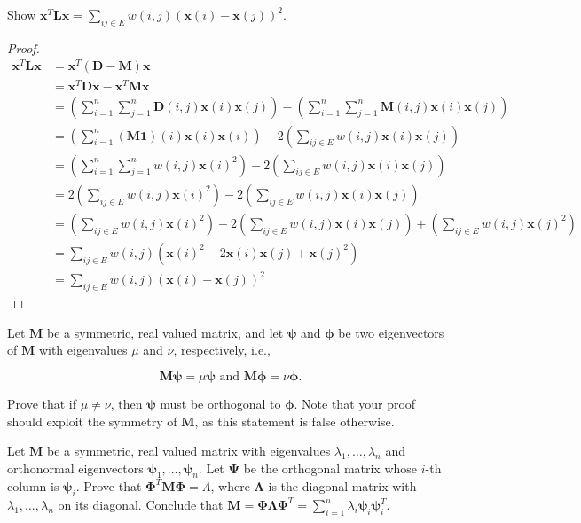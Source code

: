 \documentclass[11pt,letterpaper]{article}
\begin{document}
\begin{exercise} Show $\bm{x}^T\bm{L}\bm{x} = \sum_{ij \in E} w(i,j)(\bm{x}(i) - \bm{x}(j))^2$.
\end{exercise}

\begin{proof}
  \begin{align*}
    \bm{x}^T\bm{L}\bm{x} &= \bm{x}^T(\bm{D} - \bm{M})\bm{x}\\
    &= \bm{x}^T \bm{D}\bm{x} - \bm{x}^T \bm{M}\bm{x}\\
    &= \left(\sum_{i=1}^n \sum_{j=1}^n \bm{D}(i,j) \bm{x}(i) \bm{x}(j)\right)
    - \left(\sum_{i=1}^n \sum_{j=1}^n \bm{M}(i,j) \bm{x}(i) \bm{x}(j)\right)\\
    &= \left(\sum_{i=1}^n (\bm{M}\bm{1})(i) \bm{x}(i) \bm{x}(i)\right)
    - 2 \left(\sum_{ij \in E} w(i,j) \bm{x}(i) \bm{x}(j)\right)\\
    &= \left(\sum_{i=1}^n \sum_{j=1}^n w(i,j) \bm{x}(i)^2\right)
    - 2 \left(\sum_{ij \in E} w(i,j) \bm{x}(i) \bm{x}(j)\right)\\
    &= 2\left(\sum_{ij \in E} w(i,j) \bm{x}(i)^2\right)
    - 2 \left(\sum_{ij \in E} w(i,j) \bm{x}(i) \bm{x}(j)\right)\\
    &= \left(\sum_{ij \in E} w(i,j) \bm{x}(i)^2\right)
    - 2 \left(\sum_{ij \in E} w(i,j) \bm{x}(i) \bm{x}(j)\right)
    + \left(\sum_{ij \in E} w(i,j) \bm{x}(j)^2\right)\\
    &= \sum_{ij \in E} w(i,j) \left(\bm{x}(i)^2 - 2 \bm{x}(i) \bm{x}(j) + \bm{x}(j)^2\right)\\
    &= \sum_{ij \in E} w(i,j)(\bm{x}(i) - \bm{x}(j))^2
  \end{align*}
\end{proof}

\begin{exercise}
  Let $\bm{M}$ be a symmetric, real valued matrix, and let $\bm{\psi}$ and $\bm{\phi}$ be two eigenvectors of $\bm{M}$
  with eigenvalues $\mu$ and $\nu$, respectively, i.e.,

  $$\bm{M}\bm{\psi} = \mu \bm{\psi} \text{ and } \bm{M}\bm{\phi} = \nu \bm{\phi}.$$

  Prove that if $\mu \neq \nu$, then $\bm{\psi}$ must be orthogonal to $\bm{\phi}$.
  Note that your proof should exploit the symmetry of $\bm{M}$, as this statement is false otherwise.
\end{exercise}

\begin{exercise}
  Let $\bm{M}$ be a symmetric, real valued matrix with eigenvalues $\lambda_1,\ldots,\lambda_n$ and
  orthonormal eigenvectors $\bm{\psi}_1,\ldots,\bm{\psi}_n$.
  Let $\bm{\Psi}$ be the orthogonal matrix whose $i$-th column is $\bm{\psi}_i$.
  Prove that $\bm{\Phi}^T \bm{M} \bm{\Phi} = \Lambda$,
  where $\bm{\Lambda}$ is the diagonal matrix with $\lambda_1,\ldots,\lambda_n$ on its diagonal.
  Conclude that $\bm{M}=\bm{\Phi} \bm{\Lambda} \bm{\Phi}^T = \sum_{i=1}^n \lambda_i \bm{\psi}_i\bm{\psi}_i^T$.
\end{exercise}
\end{document}

